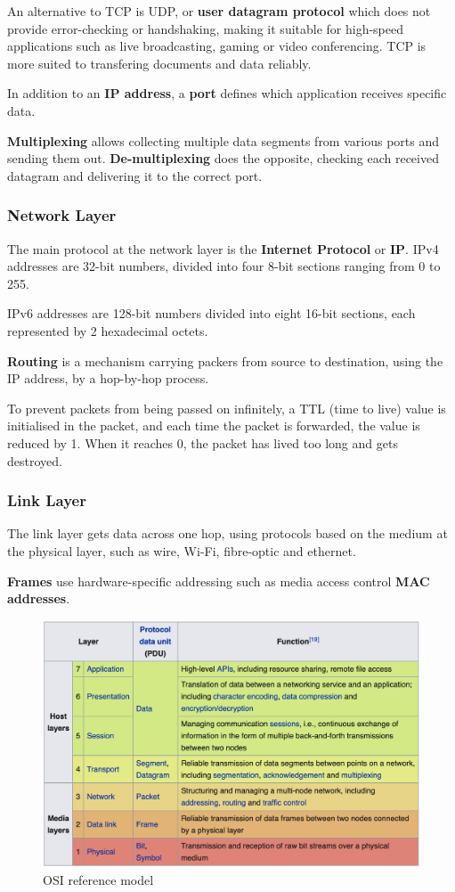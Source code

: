 An alternative to TCP is UDP, or \textbf{user datagram protocol} which does not provide error-checking or handshaking, making it suitable for high-speed applications such as live broadcasting, gaming or video conferencing. TCP is more suited to transfering documents and data reliably.

In addition to an \textbf{IP address}, a \textbf{port} defines which application receives specific data.

\textbf{Multiplexing} allows collecting multiple data segments from various ports and sending them out. \textbf{De-multiplexing} does the opposite, checking each received datagram and delivering it to the correct port.  


\subsubsection{Network Layer}
The main protocol at the network layer is the \textbf{Internet Protocol} or \textbf{IP}. IPv4 addresses are 32-bit numbers, divided into four 8-bit sections ranging from 0 to 255.

IPv6 addresses are 128-bit numbers divided into eight 16-bit sections, each represented by 2 hexadecimal octets.

\textbf{Routing} is a mechanism carrying packers from source to destination, using the IP address, by a hop-by-hop process.

To prevent packets from being passed on infinitely, a TTL (time to live) value is initialised in the packet, and each time the packet is forwarded, the value is reduced by 1. When it reaches 0, the packet has lived too long and gets destroyed.

\subsubsection{Link Layer}
The link layer gets data across one hop, using protocols based on the medium at the physical layer, such as wire, Wi-Fi, fibre-optic and ethernet.

\textbf{Frames} use hardware-specific addressing such as media access control \textbf{MAC addresses}.

\begin{figure}[H]
	\centering
	\includegraphics[width=\textwidth]{osi}
	\caption{OSI reference model}
	\label{osimodel}
\end{figure}



